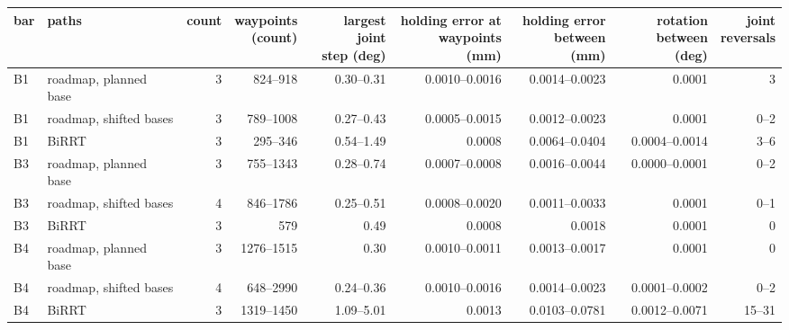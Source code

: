 \begin{tabular}{@{}llrrrrrrr@{}}
\toprule
bar & paths & count & \shortstack[r]{waypoints\\(count)} & \shortstack[r]{largest joint\\step (deg)} & \shortstack[r]{holding error at\\waypoints (mm)} & \shortstack[r]{holding error\\between (mm)} & \shortstack[r]{rotation\\between (deg)} & \shortstack[r]{joint\\reversals} \\
\midrule
B1 & roadmap, planned base & 3 & 824--918 & 0.30--0.31 & 0.0010--0.0016 & 0.0014--0.0023 & 0.0001 & 3 \\
B1 & roadmap, shifted bases & 3 & 789--1008 & 0.27--0.43 & 0.0005--0.0015 & 0.0012--0.0023 & 0.0001 & 0--2 \\
B1 & BiRRT & 3 & 295--346 & 0.54--1.49 & 0.0008 & 0.0064--0.0404 & 0.0004--0.0014 & 3--6 \\
\midrule
B3 & roadmap, planned base & 3 & 755--1343 & 0.28--0.74 & 0.0007--0.0008 & 0.0016--0.0044 & 0.0000--0.0001 & 0--2 \\
B3 & roadmap, shifted bases & 4 & 846--1786 & 0.25--0.51 & 0.0008--0.0020 & 0.0011--0.0033 & 0.0001 & 0--1 \\
B3 & BiRRT & 3 & 579 & 0.49 & 0.0008 & 0.0018 & 0.0001 & 0 \\
\midrule
B4 & roadmap, planned base & 3 & 1276--1515 & 0.30 & 0.0010--0.0011 & 0.0013--0.0017 & 0.0001 & 0 \\
B4 & roadmap, shifted bases & 4 & 648--2990 & 0.24--0.36 & 0.0010--0.0016 & 0.0014--0.0023 & 0.0001--0.0002 & 0--2 \\
B4 & BiRRT & 3 & 1319--1450 & 1.09--5.01 & 0.0013 & 0.0103--0.0781 & 0.0012--0.0071 & 15--31 \\
\bottomrule
\end{tabular}
